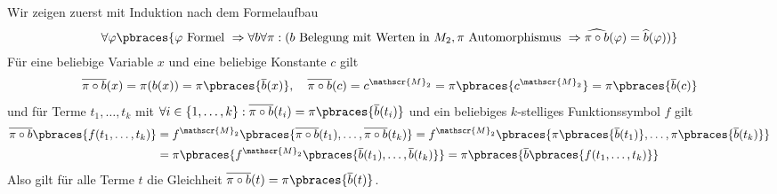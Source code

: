 \begin{solution}
	
	Wir zeigen zuerst mit Induktion nach dem Formelaufbau
	\begin{align*}
	\forall \varphi \pbraces{\varphi \text{ Formel } \Rightarrow \forall b \forall \pi: (b \text{ Belegung mit Werten in } M_2, \pi \text{ Automorphismus } \Rightarrow \widehat{\pi \circ b}(\varphi) = \widehat{b}(\varphi))}
	\end{align*}
	Für eine beliebige Variable $x$ und eine beliebige Konstante $c$ gilt
	\begin{align*}
	\overline{\pi \circ b}(x) = \pi(b(x)) = \pi\pbraces{\overline{b}(x)}, \quad \overline{\pi \circ b}(c) = c^{\mathscr{M}_2} = \pi\pbraces{c^{\mathscr{M}_2}}= \pi\pbraces{\overline{b}(c)}
	\end{align*}
	und für Terme $t_1, \dots, t_k$ mit $\forall i \in \{1, \dots, k\}: \overline{\pi \circ b}(t_i) = \pi\pbraces{\overline{b}(t_i)}$ und ein beliebiges $k$-stelliges Funktionssymbol $f$ gilt
	\begin{align*}
	\overline{\pi \circ b}\pbraces{f(t_1, \dots, t_k)} &= f^{\mathscr{M}_2}\pbraces{\overline{\pi \circ b}(t_1), \dots , \overline{\pi \circ b}(t_k)} = f^{\mathscr{M}_2}\pbraces{\pi\pbraces{\overline{b}(t_1)}, \dots, \pi\pbraces{\overline{b}(t_k)}} \\
	&= \pi \pbraces{f^{\mathscr{M}_2}\pbraces{\overline{b}(t_1), \dots, \overline{b}(t_k)}} = \pi \pbraces{\overline{b} \pbraces{f(t_1, \dots, t_k)}}
	\end{align*}
	Also gilt für alle Terme $t$ die Gleichheit $\overline{\pi \circ b}(t) = \pi\pbraces{\overline{b}(t)}$.
	

\end{solution}
